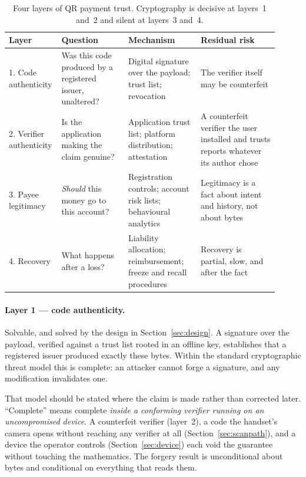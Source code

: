\documentclass[10pt,a4paper,twocolumn]{article}
\newenvironment{widetable}{\begin{table}[t]}{\end{table}}
\newenvironment{widetable}{\begin{table}[t]}{\end{table}}
\begin{document}
\begin{widetable}
\centering
\small
\begin{tabular}{@{}p{0.13\linewidth}p{0.24\linewidth}p{0.26\linewidth}p{0.28\linewidth}@{}}
\toprule
\textbf{Layer} & \textbf{Question} & \textbf{Mechanism} & \textbf{Residual risk} \\
\midrule
1. Code authenticity &
  Was this code produced by a registered issuer, unaltered? &
  Digital signature over the payload; trust list; revocation &
  The verifier itself may be counterfeit \\[0.4em]
2. Verifier authenticity &
  Is the application making the claim genuine? &
  Application trust list; platform distribution; attestation &
  A counterfeit verifier the user installed and trusts reports whatever its
  author chose \\[0.4em]
3. Payee legitimacy &
  \emph{Should} this money go to this account? &
  Registration controls; account risk lists; behavioural analytics &
  Legitimacy is a fact about intent and history, not about bytes \\[0.4em]
4. Recovery &
  What happens after a loss? &
  Liability allocation; reimbursement; freeze and recall procedures &
  Recovery is partial, slow, and after the fact \\
\bottomrule
\end{tabular}
\caption{Four layers of QR payment trust. Cryptography is decisive at layers~1
and~2 and silent at layers~3 and~4.}
\label{tab:layers}
\end{widetable}

\paragraph{Layer 1 --- code authenticity.}
Solvable, and solved by the design in Section~\ref{sec:design}. A signature over
the payload, verified against a trust list rooted in an offline key, establishes
that a registered issuer produced exactly these bytes. Within the standard
cryptographic threat model this is complete: an attacker cannot forge a
signature, and any modification invalidates one.

That model should be stated where the claim is made rather than corrected later.
``Complete'' means complete \emph{inside a conforming verifier running on an
uncompromised device}. A counterfeit verifier (layer~2), a code the handset's
camera opens without reaching any verifier at all
(Section~\ref{sec:scanpath}), and a device the operator controls
(Section~\ref{sec:device}) each void the guarantee without touching the
mathematics. The forgery result is unconditional about bytes and conditional on
everything that reads them.
\end{document}
